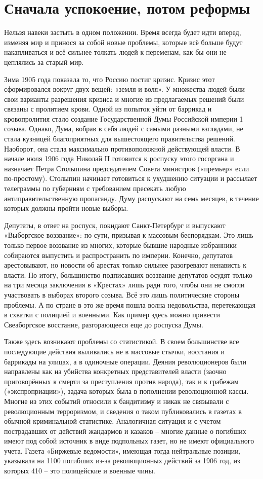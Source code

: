 \chapter{Сначала успокоение, потом реформы}


Нельзя навеки застыть в одном положении. Время всегда будет идти вперед, изменяя мир и принося за собой новые проблемы, которые всё больше будут накапливаться и всё сильнее толкать людей к переменам, как бы они не цеплялись за старый мир.

Зима 1905 года показала то, что Россию постиг кризис. Кризис этот сформировался вокруг двух вещей: «земля и воля». У множества людей были свои варианты разрешения кризиса и многие из предлагаемых решений были связаны с пролитием крови. Одной из попыток уйти от баррикад и кровопролития стало создание Государственной Думы Российской империи 1 созыва. Однако, Дума, вобрав в себя людей с самыми разными взглядами, не стала кузницей благоприятных для вышестоящего правительства решений. Наоборот, она стала максимально противоположной действующей власти. В начале июля 1906 года Николай II готовится к роспуску этого госоргана и назначает Петра Столыпина председателем Совета министров («премьер» если по-простому). Столыпин начинает готовиться к ухудшению ситуации и рассылает телеграммы по губерниям с требованием пресекать любую антиправительственную пропаганду. Думу распускают на семь месяцев, в течение которых должны пройти новые выборы.

Депутаты, в ответ на роспуск, покидают Санкт-Петербург и выпускают «Выборгское воззвание»: по сути, призывая к массовым беспорядкам. Это лишь только первое воззвание из многих, которые бывшие народные избранники собираются выпустить и распространить по империи. Конечно, депутатов арестовывают, но новости об арестах только сильнее разогревают ненависть к власти. По итогу, большинство подписавших воззвание депутатов осудят только на три месяца заключения в «Крестах» лишь ради того, чтобы они не смогли участвовать в выборах второго созыва.
Всё это лишь политические стороны проблемы. А по стране в это же время пошла волна недовольства, перетекающая в схватки с полицией и военными. Как пример здесь можно привести Свеаборгское восстание, разгорающееся еще до роспуска Думы.

Также здесь возникают проблемы со статистикой. В своем большинстве все последующие действия выливались не в массовые стычки, восстания и баррикады на улицах, а в одиночные операции. Деяния революционеров были направлены как на убийства конкретных представителей власти (заочно приговорённых к смерти за преступления против народа), так и к грабежам («экспроприации»), задача которых была в пополнении революционной кассы. Многие из этих событий относили к бандитизму и никак не связывали с революционным терроризмом, и сведения о таком публиковались в газетах в обычной криминальной статистике. Аналогичная ситуация и с учетом пострадавших от действий жандармов и казаков – многие данные о погибших имеют под собой источник в виде подпольных газет, но не имеют официального учета. Газета «Биржевые ведомости»,  имеющая тогда нейтральные позиции, указывала на 1100 погибших из-за революционных действий за 1906 год, из которых 410 – это полицейские и военные чины.

